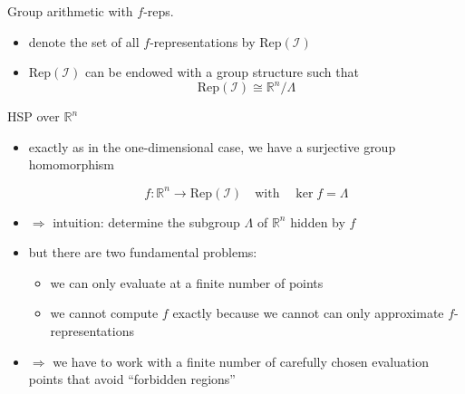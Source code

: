 \documentclass[slideColor]{prosper}
\renewcommand{\R}{\mathbb{R}}
\renewcommand{\>}{\rangle}
\newcommand{\<}{\langle}
\begin{document}

\begin{slide}{Group arithmetic with $f$-reps.}

\begin{itemize}
\item denote the set of all $f$-representations by $\mathrm{Rep}(\mathcal{I})$

\bigskip
\item $\mathrm{Rep}(\mathcal{I})$ can be endowed with a group structure such that 
\[
\mathrm{Rep}(\mathcal{I}) \cong \R^n / \Lambda
\]
\end{itemize}

\end{slide}


\begin{slide}{HSP over $\R^n$}

\begin{itemize}
\item exactly as in the one-dimensional case, we have a surjective group homomorphism

\[
f : \R^n \rightarrow \mathrm{Rep}(\mathcal{I}) \quad \mbox{with}\quad
\ker f = \Lambda
\]

\medskip
\item $\Rightarrow$ intuition: determine the subgroup $\Lambda$ of $\R^n$ 
hidden by $f$

\medskip
\item but there are two fundamental problems:

\medskip
\begin{itemize}
\item we can only evaluate at a finite number of points

\medskip
\item we cannot compute $f$ exactly because we cannot can only approximate $f$-representations 
\end{itemize}

\item $\Rightarrow$ we have to work with a finite number of carefully chosen evaluation points that avoid ``forbidden regions''
\end{itemize}

\end{slide}

\end{document}
